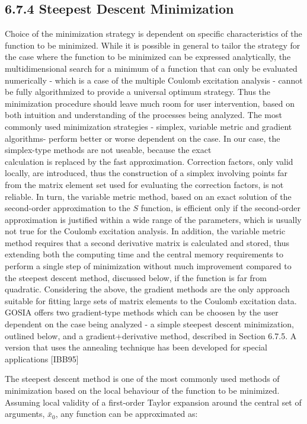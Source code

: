 \documentclass[10pt]{article}
\begin{document}
\subsection*{6.7.4 Steepest Descent Minimization}
Choice of the minimization strategy is dependent on specific characteristics of the function to be minimized. While it is possible in general to tailor the strategy for the case where the function to be minimized can be expressed analytically, the multidimensional search for a minimum of a function that can only be evaluated numerically - which is a case of the multiple Coulomb excitation analysis - cannot be fully algorithmized to provide a universal optimum strategy. Thus the minimization procedure should leave much room for user intervention, based on both intuition and understanding of the processes being analyzed. The most commonly used minimization strategies - simplex, variable metric and gradient algorithms- perform better or worse dependent on the case. In our case, the simplex-type methods are not useable, because the exact\\
calculation is replaced by the fast approximation. Correction factors, only valid locally, are introduced, thus the construction of a simplex involving points far from the matrix element set used for evaluating the correction factors, is not reliable. In turn, the variable metric method, based on an exact solution of the second-order approximation to the $S$ function, is efficient only if the second-order approximation is justified within a wide range of the parameters, which is usually not true for the Coulomb excitation analysis. In addition, the variable metric method requires that a second derivative matrix is calculated and stored, thus extending both the computing time and the central memory requirements to perform a single step of minimization without much improvement compared to the steepest descent method, discussed below, if the function is far from quadratic. Considering the above, the gradient methods are the only approach suitable for fitting large sets of matrix elements to the Coulomb excitation data. GOSIA offers two gradient-type methods which can be choosen by the user dependent on the case being analyzed - a simple steepest descent minimization, outlined below, and a gradient+derivative method, described in Section 6.7.5. A version that uses the annealing technique has been developed for special applications [IBB95]

The steepest descent method is one of the most commonly used methods of minimization based on the local behaviour of the function to be minimized. Assuming local validity of a first-order Taylor expansion around the central set of arguments, $\bar{x}_{0}$, any function can be approximated as:
\end{document}

